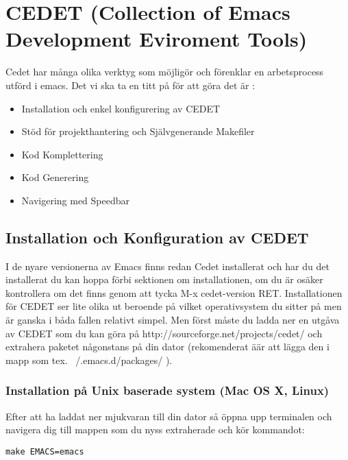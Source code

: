 \documentclass[12pt]{article} %
\begin{document}


\newpage
\section{CEDET (Collection of Emacs Development Eviroment Tools)} %

Cedet har många olika verktyg som möjligör och förenklar en arbetsprocess utförd i emacs. Det vi ska ta en titt på för att göra det är :
\begin{itemize}
\item Installation och enkel konfigurering av CEDET
\item Stöd för projekthantering och Självgenerande Makefiler
\item Kod Komplettering
\item Kod Generering
\item Navigering med Speedbar
\end{itemize}


\subsection{Installation och Konfiguration av CEDET} %
I de nyare versionerna av Emacs finns redan Cedet installerat och har du det installerat du kan hoppa förbi sektionen om installationen, om du är osäker kontrollera om det finns genom att tycka M-x cedet-version RET. 
Installationen för CEDET ser lite olika ut beroende på vilket operativsystem du sitter på men är ganska i båda fallen relativt simpel. Men först måste du ladda ner en utgåva av CEDET som du kan göra på
{http://sourceforge.net/projects/cedet/} och extrahera paketet någonstans på din dator (rekomenderat äär att lägga den i mapp som tex.  ~/.emacs.d/packages/ ).

\subsubsection{Installation på Unix baserade system (Mac OS X, Linux)}
Efter att ha laddat ner mjukvaran till din dator så öppna upp terminalen och navigera dig till mappen som du nyss extraherade och kör kommandot:
\begin{lstlisting}
make EMACS=emacs
\end{lstlisting}
\end{document}
